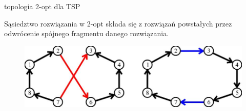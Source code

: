 \documentclass[blue]{beamer}
\begin{document}
\begin{frame}{topologia 2-opt dla TSP}
\begin{block}{Sąsiedztwo rozwiązania w 2-opt}
składa się z rozwiązań
powstałych przez odwrócenie spójnego
fragmentu danego rozwiązania.
\end{block}
\begin{figure}
\includegraphics[scale=.7]{2opt.jpg}
\end{figure}
\end{frame}






\end{document}

